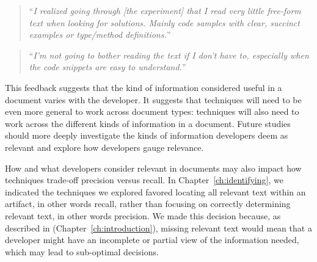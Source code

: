 \smallskip
\begin{quote}
``\textit{I realized going through [the experiment] that I read very little free-form text when looking for solutions. Mainly code samples with clear, succinct examples or type/method definitions.}''
\end{quote}

\begin{quote}
``\textit{I'm not going to bother reading the text if I don't have to, especially when the code snippets are easy to understand.}''
\end{quote}










\smallskip
This feedback suggests that the kind of information
considered useful in a document varies with the
developer. It suggests that techniques will need to
be even more general to work across document
types: techniques will also need to work across
the different kinds of information in a document.
Future studies should more deeply investigate
the kinds of information developers deem as
relevant and explore how developers gauge relevance.

How and what developers consider relevant in
documents may also impact how techniques trade-off
precision versus recall. 
In Chapter~\ref{ch:identifying}, we indicated
the techniques we explored favored locating
all relevant text within an
artifact, in other words recall, rather
than focusing on 
correctly determining relevant text, in other
words precision. 
We made this decision because, as described in 
 (Chapter~\ref{ch:introduction}),
missing relevant text would mean that a developer might have an incomplete or partial view of the information needed, which may lead to
sub-optimal decisions.

